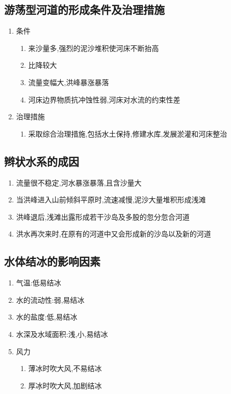 \documentclass[a4paper]{article}
\begin{document}
    \subsection{游荡型河道的形成条件及治理措施}
    \begin{enumerate}
        \item 条件
        \begin{enumerate}
            \item 来沙量多,强烈的泥沙堆积使河床不断抬高
            \item 比降较大
            \item 流量变幅大,洪峰暴涨暴落
            \item 河床边界物质抗冲蚀性弱,河床对水流的约束性差
        \end{enumerate}
        \item 治理措施
        \begin{enumerate}
            \item 采取综合治理措施,包括水土保持,修建水库,发展淤灌和河床整治
        \end{enumerate}
    \end{enumerate}
    \subsection{辫状水系的成因}
    \begin{enumerate}
        \item 流量很不稳定,河水暴涨暴落,且含沙量大
        \item 当洪峰进入山前倾斜平原时,流速减慢,泥沙大量堆积形成浅滩
        \item 洪峰退后,浅滩出露形成若干沙岛及多股的忽分忽合河道
        \item 洪水再次来时,在原有的河道中又会形成新的沙岛以及新的河道
    \end{enumerate}
    \subsection{水体结冰的影响因素}
    \begin{enumerate}
        \item 气温:低易结冰
        \item 水的流动性:弱,易结冰
        \item 水的盐度:低,易结冰
        \item 水深及水域面积:浅,小,易结冰
        \item 风力
        \begin{enumerate}
            \item 薄冰时吹大风,不易结冰
            \item 厚冰时吹大风,加剧结冰
        \end{enumerate}
    \end{enumerate}
\end{document}

